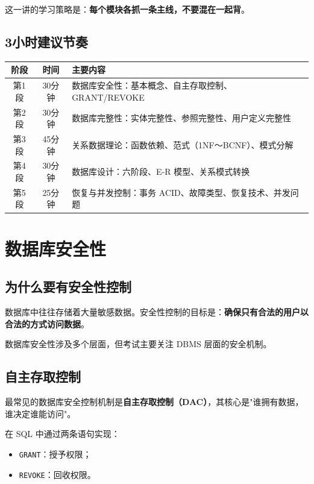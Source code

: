 \documentclass{../../note}
\begin{document}
这一讲的学习策略是：\textbf{每个模块各抓一条主线，不要混在一起背}。

\subsection{3小时建议节奏}

\begin{center}
\begin{tabular}{|c|c|p{9cm}|}
\hline
阶段 & 时间 & 主要内容 \\
\hline
第1段 & 30分钟 & 数据库安全性：基本概念、自主存取控制、GRANT/REVOKE \\
\hline
第2段 & 30分钟 & 数据库完整性：实体完整性、参照完整性、用户定义完整性 \\
\hline
第3段 & 45分钟 & 关系数据理论：函数依赖、范式（1NF～BCNF）、模式分解 \\
\hline
第4段 & 30分钟 & 数据库设计：六阶段、E-R 模型、关系模式转换 \\
\hline
第5段 & 25分钟 & 恢复与并发控制：事务 ACID、故障类型、恢复技术、并发问题 \\
\hline
\end{tabular}
\end{center}

\section{数据库安全性}

\subsection{为什么要有安全性控制}

数据库中往往存储着大量敏感数据。安全性控制的目标是：\textbf{确保只有合法的用户以合法的方式访问数据}。

数据库安全性涉及多个层面，但考试主要关注 DBMS 层面的安全机制。

\subsection{自主存取控制}

最常见的数据库安全控制机制是\textbf{自主存取控制（DAC）}，其核心是"谁拥有数据，谁决定谁能访问"。

在 SQL 中通过两条语句实现：

\begin{itemize}
  \item \texttt{GRANT}：授予权限；
  \item \texttt{REVOKE}：回收权限。
\end{itemize}
\end{document}
